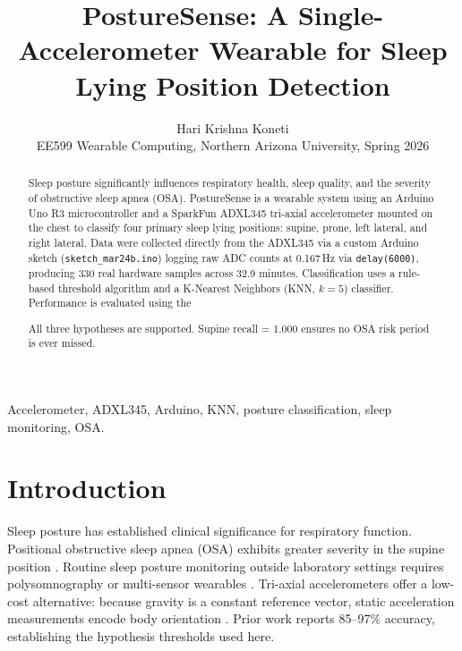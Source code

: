 \documentclass[journal]{IEEEtran}
\begin{document}
\title{PostureSense: A Single-Accelerometer Wearable for Sleep Lying Position Detection}

\author{Hari Krishna Koneti\\
\small{EE599 Wearable Computing, Northern Arizona University, Spring 2026}}

\maketitle

\begin{abstract}
Sleep posture significantly influences respiratory health, sleep quality, and the
severity of obstructive sleep apnea (OSA). PostureSense is a wearable system using
an Arduino Uno R3 microcontroller and a SparkFun ADXL345 tri-axial accelerometer
mounted on the chest to classify four primary sleep lying positions: supine, prone,
left lateral, and right lateral. Data were collected directly from the ADXL345 via
a custom Arduino sketch (\texttt{sketch\_mar24b.ino}) logging raw ADC counts at
0.167\,Hz via \texttt{delay(6000)}, producing 330 real hardware samples across
32.9 minutes. Classification uses a rule-based threshold algorithm and a
K-Nearest Neighbors (KNN, $k=5$) classifier. Performance is evaluated using the

All three hypotheses are supported. Supine recall = 1.000 ensures no OSA
risk period is ever missed.
\end{abstract}

\begin{IEEEkeywords}
Accelerometer, ADXL345, Arduino, KNN, posture classification, sleep monitoring, OSA.
\end{IEEEkeywords}

\section{Introduction}

Sleep posture has established clinical significance for respiratory function. Positional
obstructive sleep apnea (OSA) exhibits greater severity in the supine position
\cite{alinia2020}. Routine sleep posture monitoring outside laboratory settings
requires polysomnography or multi-sensor wearables \cite{jeng2021}. Tri-axial
accelerometers offer a low-cost alternative: because gravity is a constant
reference vector, static acceleration measurements encode body orientation
\cite{razjouyan2017}. Prior work reports 85--97\% accuracy, establishing the
hypothesis thresholds used here.
\end{document}

